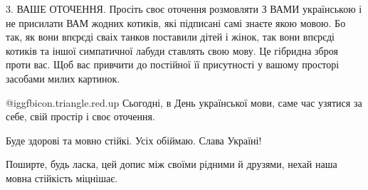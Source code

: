 3. ВАШЕ ОТОЧЕННЯ. Просіть своє оточення розмовляти З ВАМИ українською і не
присилати ВАМ жодних котиків, які підписані самі знаєте якою мовою. Бо так, як
вони впєрєді сваіх танков поставили дітей і жінок, так вони впєрєді котиків та
іншої симпатичної лабуди ставлять свою мову. Це гібридна зброя проти вас. Щоб
вас привчити до постійної її присутності у вашому просторі засобами милих
картинок.

 @igg{fbicon.triangle.red.up} Сьогодні, в День української мови, саме час узятися за себе, свій простір і
своє оточення.

Буде здорові та мовно стійкі. Усіх обіймаю. Слава Україні!

Поширте, будь ласка, цей допис між своїми рідними й друзями, нехай наша мовна
стійкість міцнішає.

